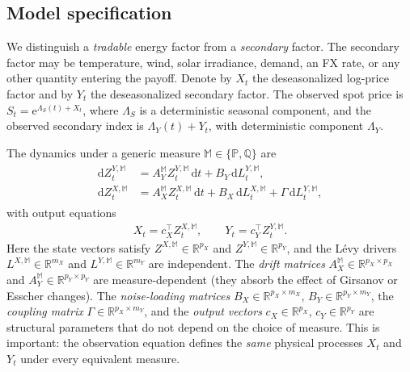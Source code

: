 \documentclass[10pt,a4paper,reqno]{amsart}
\newcommand{\R}{\mathbb{R}}
\newcommand{\Q}{\mathbb{Q}}
\newcommand{\PP}{\mathbb{P}}
\newcommand{\1}{\mathbbm{1}}
\newcommand{\dd}{\mathrm{d}}
\newcommand{\ee}{\mathrm{e}}
\begin{document}
\subsection{Model specification}

We distinguish a \emph{tradable} energy factor from a \emph{secondary} factor.
The secondary factor may be temperature, wind, solar irradiance, demand, an FX
rate, or any other quantity entering the payoff. Denote by $X_t$ the
deseasonalized log-price factor and by $Y_t$ the deseasonalized secondary
factor. The observed spot price is $S_t = \ee^{\Lambda_S(t)+X_t}$, where
$\Lambda_S$ is a deterministic seasonal component, and the observed secondary
index is $\Lambda_Y(t)+Y_t$, with deterministic component $\Lambda_Y$.

The dynamics under a generic measure $\mathbb{M} \in \{\PP,\Q\}$ are
\begin{align}\label{eq:coupled_model}
\begin{aligned}
  \dd Z_t^{Y,\mathbb{M}}
    &= A_Y^{\mathbb{M}} Z_t^{Y,\mathbb{M}}\,\dd t
       + B_Y\,\dd L_t^{Y,\mathbb{M}},\\
  \dd Z_t^{X,\mathbb{M}}
    &= A_X^{\mathbb{M}} Z_t^{X,\mathbb{M}}\,\dd t
       + B_X\,\dd L_t^{X,\mathbb{M}}
       + \Gamma\,\dd L_t^{Y,\mathbb{M}},
\end{aligned}
\end{align}
with output equations
\begin{align}\label{eq:outputs_coupled}
  X_t = c_X^\top Z_t^{X,\mathbb{M}},
  \qquad
  Y_t = c_Y^\top Z_t^{Y,\mathbb{M}}.
\end{align}
Here the state vectors satisfy $Z^{X,\mathbb{M}} \in \R^{p_X}$ and
$Z^{Y,\mathbb{M}} \in \R^{p_Y}$, and the Lévy drivers $L^{X,\mathbb{M}} \in
\R^{m_X}$ and $L^{Y,\mathbb{M}} \in \R^{m_Y}$ are independent.
The \emph{drift matrices} $A_X^{\mathbb{M}} \in \R^{p_X \times p_X}$ and
$A_Y^{\mathbb{M}} \in \R^{p_Y \times p_Y}$ are measure-dependent (they absorb
the effect of Girsanov or Esscher changes). The \emph{noise-loading matrices}
$B_X \in \R^{p_X \times m_X}$, $B_Y \in \R^{p_Y \times m_Y}$, the
\emph{coupling matrix} $\Gamma \in \R^{p_X \times m_Y}$, and the
\emph{output vectors} $c_X \in \R^{p_X}$, $c_Y \in \R^{p_Y}$ are
structural parameters that do not depend on the choice of measure. This is
important: the observation equation defines the \emph{same} physical
processes $X_t$ and $Y_t$ under every equivalent measure.
\end{document}
